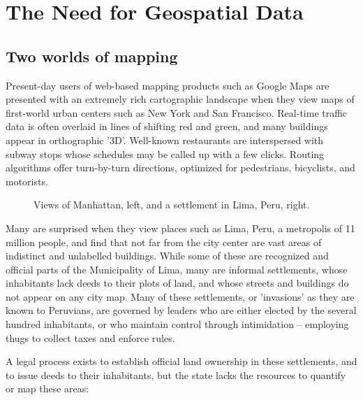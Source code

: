 \documentclass[11pt]{report}
\begin{document}
\chapter{The Need for Geospatial Data}
\section{Two worlds of mapping}

Present-day users of web-based mapping products such as Google Maps are presented with an extremely rich cartographic landscape when they view maps of first-world urban centers such as New York and San Francisco. Real-time traffic data is often overlaid in lines of shifting red and green, and many buildings appear in orthographic '3D'. Well-known restaurants are interspersed with subway stops whose schedules may be called up with a few clicks. Routing algorithms offer turn-by-turn directions, optimized for pedestrians, bicyclists, and motorists. 

\begin{figure}
	\begin{flushright}
		Views of Manhattan, left, and a settlement in Lima, Peru, right.
	\end{flushright}
\end{figure}

Many are surprised when they view places such as Lima, Peru, a metropolis of 11 million people, and find that not far from the city center are vast areas of indistinct and unlabelled buildings. While some of these are recognized and official parts of the Municipality of Lima, many are informal settlements, whose inhabitants lack deeds to their plots of land, and whose streets and buildings do not appear on any city map. Many of these settlements, or 'invasions' as they are known to Peruvians, are governed by leaders who are either elected by the several hundred inhabitants, or who maintain control through intimidation -- employing thugs to collect taxes and enforce rules. 

A legal process exists to establish official land ownership in these settlements, and to issue deeds to their inhabitants, but the state lacks the resources to quantify or map these areas:

\end{document}
